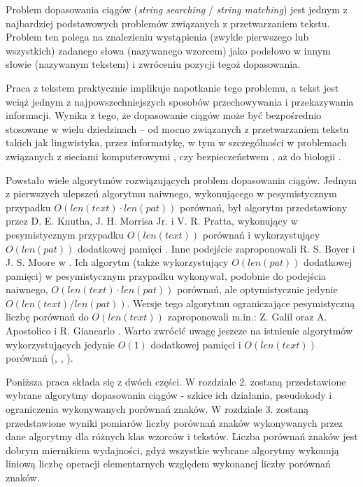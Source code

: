 Problem dopasowania ciągów (\textit{string searching} / \textit{string matching}) jest jednym z najbardziej podstawowych problemów związanych z przetwarzaniem tekstu. Problem ten polega na znalezieniu wystąpienia (zwykle pierwszego lub wszystkich) zadanego słowa (nazywanego wzorcem) jako podsłowo w innym słowie (nazywanym tekstem) i zwróceniu pozycji tegoż dopasowania. 

Praca z tekstem praktycznie implikuje napotkanie tego problemu, a tekst jest wciąż jednym z najpowszechniejszych sposobów przechowywania i przekazywania informacji. Wynika z tego, że dopasowanie ciągów może być bezpośrednio stosowane w wielu dziedzinach -- od mocno związanych z przetwarzaniem tekstu takich jak lingwistyka, przez informatykę, w tym w szczególności w problemach związanych z sieciami komputerowymi \cite{10.5555/788015.788577}, czy bezpieczeństwem \cite{10.1145/1015047.1015055}, aż do biologii \cite{RYU2020137}.

Powstało wiele algorytmów rozwiązujących problem dopasowania ciągów. Jednym z pierwszych ulepszeń algorytmu naiwnego, wykonującego w pesymistycznym przypadku $O(len(text) \cdot len(pat))$ porównań, był algorytm przedstawiony przez D. E. Knutha, J. H. Morrisa Jr. i V. R. Pratta, wykonujący w pesymistycznym przypadku $O(len(text))$ porównań i wykorzystujący $O(len(pat))$ dodatkowej pamięci \cite{KMP}. Inne podejście zaproponowali R. S. Boyer i J. S. Moore w \cite{BM}. Ich algorytm (także wykorzystujący $O(len(pat))$ dodatkowej pamięci) w pesymistycznym przypadku wykonywał, podobnie do podejścia naiwnego, $O(len(text) \cdot len(pat))$ porównań, ale optymistycznie jedynie $O(len(text)/len(pat))$. Wersje tego algorytmu ograniczające pesymistyczną liczbę porównań do $O(len(text))$ zaproponowali m.in.: Z. Galil \cite{10.1145/359146.359148} oraz A. Apostolico i R. Giancarlo \cite{AG}. Warto zwrócić uwagę jeszcze na istnienie algorytmów wykorzystujących jedynie $O(1)$ dodatkowej pamięci i $O(len(text))$ porównań (\cite{Cr-or}, \cite{GS}, \cite{TW}).

Poniższa praca składa się z dwóch części. W rozdziale 2. zostaną przedstawione wybrane algorytmy dopasowania ciągów - szkice ich działania, pseudokody i ograniczenia wykonywanych porównań znaków. W rozdziale 3. zostaną przedstawione wyniki pomiarów liczby porównań znaków wykonywanych przez dane algorytmy dla różnych klas wzorców i tekstów. Liczba porównań znaków jest dobrym miernikiem wydajności, gdyż wszystkie wybrane algorytmy wykonują liniową liczbę operacji elementarnych względem wykonanej liczby porównań znaków.

